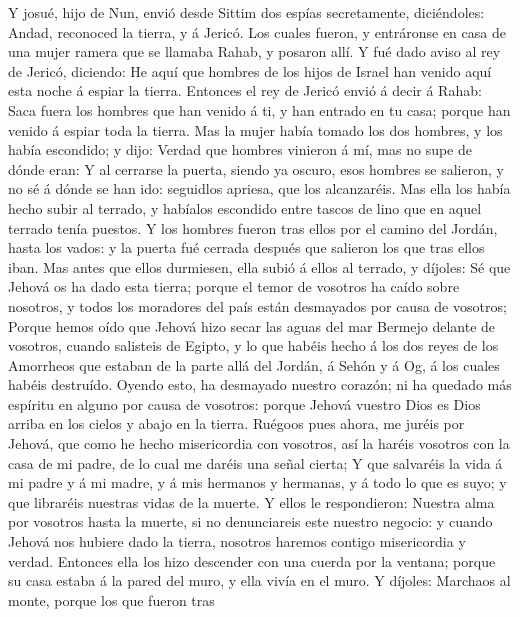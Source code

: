  Y josué, hijo de Nun, envió desde Sittim dos espías
secretamente, diciéndoles: Andad, reconoced la tierra, y á Jericó. Los
cuales fueron, y entráronse en casa de una mujer ramera que se llamaba
Rahab, y posaron allí.  Y fué dado aviso al rey de Jericó,
diciendo: He aquí que hombres de los hijos de Israel han venido aquí
esta noche á espiar la tierra.  Entonces el rey de Jericó
envió á decir á Rahab: Saca fuera los hombres que han venido á ti, y han
entrado en tu casa; porque han venido á espiar toda la tierra.
 Mas la mujer había tomado los dos hombres, y los había
escondido; y dijo: Verdad que hombres vinieron á mí, mas no supe de
dónde eran:  Y al cerrarse la puerta, siendo ya oscuro, esos
hombres se salieron, y no sé á dónde se han ido: seguidlos apriesa, que
los alcanzaréis.  Mas ella los había hecho subir al terrado,
y habíalos escondido entre tascos de lino que en aquel terrado tenía
puestos.  Y los hombres fueron tras ellos por el camino del
Jordán, hasta los vados: y la puerta fué cerrada después que salieron
los que tras ellos iban.  Mas antes que ellos durmiesen,
ella subió á ellos al terrado, y díjoles:  Sé que Jehová os
ha dado esta tierra; porque el temor de vosotros ha caído sobre
nosotros, y todos los moradores del país están desmayados por causa de
vosotros;  Porque hemos oído que Jehová hizo secar las
aguas del mar Bermejo delante de vosotros, cuando salisteis de Egipto, y
lo que habéis hecho á los dos reyes de los Amorrheos que estaban de la
parte allá del Jordán, á Sehón y á Og, á los cuales habéis destruído.
 Oyendo esto, ha desmayado nuestro corazón; ni ha quedado
más espíritu en alguno por causa de vosotros: porque Jehová vuestro Dios
es Dios arriba en los cielos y abajo en la tierra.  Ruégoos
pues ahora, me juréis por Jehová, que como he hecho misericordia con
vosotros, así la haréis vosotros con la casa de mi padre, de lo cual me
daréis una señal cierta;  Y que salvaréis la vida á mi
padre y á mi madre, y á mis hermanos y hermanas, y á todo lo que es
suyo; y que libraréis nuestras vidas de la muerte.  Y ellos
le respondieron: Nuestra alma por vosotros hasta la muerte, si no
denunciareis este nuestro negocio: y cuando Jehová nos hubiere dado la
tierra, nosotros haremos contigo misericordia y verdad. 
Entonces ella los hizo descender con una cuerda por la ventana; porque
su casa estaba á la pared del muro, y ella vivía en el muro.
 Y díjoles: Marchaos al monte, porque los que fueron tras

